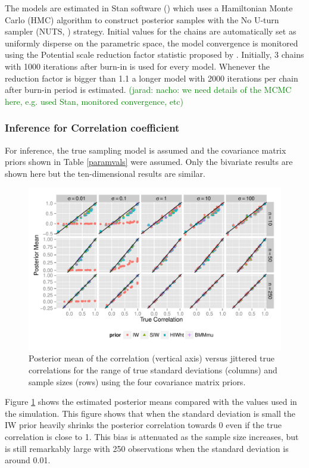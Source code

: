 \documentclass[12pt]{article}
\newcommand{\jarad}[1]{\textcolor{green}{(jarad: #1)}}
\begin{document}
The models are estimated in Stan software (\cite{stan2014}) which uses a Hamiltonian Monte Carlo (HMC) algorithm to construct posterior samples with the No U-turn sampler (NUTS, \cite{hoffman2011no}) strategy. Initial values for the chains are automatically set as uniformly disperse on the parametric space, the model convergence is monitored using the Potential scale reduction factor statistic proposed by \cite{bda2003}.
Initially, 3 chains with 1000 iterations after burn-in is used for every model. Whenever the reduction factor is bigger than 1.1 a longer model with 2000 iterations per chain after burn-in period is estimated.  \jarad{nacho: we need details of the MCMC here, e.g. used Stan, monitored convergence, etc}

\subsubsection{Inference for Correlation coefficient}

For inference, the true sampling model is assumed and the covariance matrix priors shown in Table \ref{paramvals} were assumed. Only the bivariate results are shown here but the ten-dimensional results are similar.

\begin{figure}[hbtp]
\centering
\includegraphics[width=\textwidth] {fig_rho_d2} 
\vspace{-.5in}
\caption{Posterior mean of the correlation (vertical axis) versus jittered true correlations for the range of true standard deviations (columns) and sample sizes (rows) using the four covariance matrix priors.}
\label{rhod2}
\end{figure}

Figure \ref{rhod2} shows the estimated posterior means compared with the values used in the simulation. This figure shows that when the standard deviation is small the IW prior heavily shrinks the posterior correlation towards 0 even if the true correlation is close to 1. This bias is attenuated as the sample size increases, but is still remarkably large with 250 observations when the standard deviation is around 0.01. 
\end{document}
